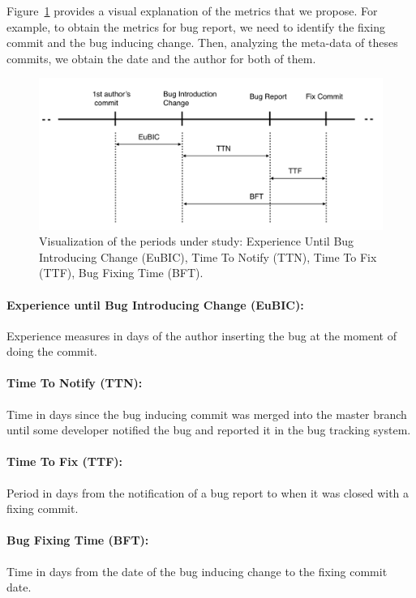 \documentclass[a4paper]{article}
\begin{document}
Figure~\ref{fig:metrics} provides a visual explanation of the metrics that we propose. For example, to obtain the metrics for bug report, we need to identify the fixing commit and the bug inducing change. Then, analyzing the meta-data of theses commits, we obtain the date and the author for both of them.

\begin{figure}[ht]
\centering
\includegraphics[width=\columnwidth]{metrics.png}
\caption{Visualization of the periods under study: Experience Until Bug Introducing Change (EuBIC),  Time To Notify (TTN), Time To Fix (TTF), Bug Fixing Time (BFT).}
\label{fig:metrics}       %
\end{figure}

\paragraph{Experience until Bug Introducing Change (EuBIC):}
Experience measures in days of the author inserting the bug at the moment of doing the commit. 
\paragraph{Time To Notify (TTN):}
Time in days since the bug inducing commit was merged into the master branch until some developer notified the bug and reported it in the bug tracking system. 
\paragraph{Time To Fix (TTF):}
Period in days from the notification of a bug report to when it was closed with a fixing commit.
\paragraph{Bug Fixing Time (BFT):}
Time in days from the date of the bug inducing change to the fixing commit date.
\end{document}
